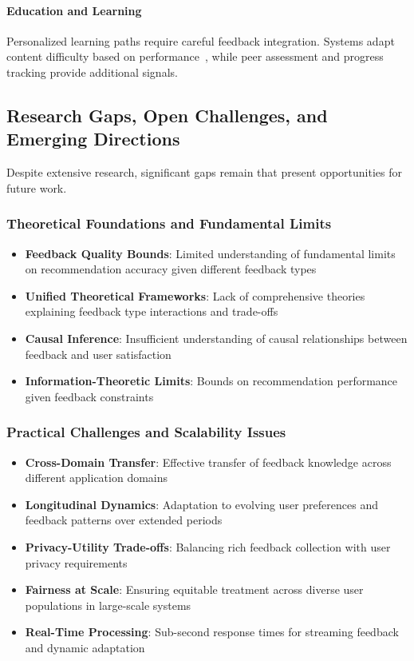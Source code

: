 \paragraph{Education and Learning}
Personalized learning paths require careful feedback integration. Systems adapt content difficulty based on performance~\cite{tang2019towards}, while peer assessment and progress tracking provide additional signals.

\subsection{Research Gaps, Open Challenges, and Emerging Directions}

Despite extensive research, significant gaps remain that present opportunities for future work.

\subsubsection{Theoretical Foundations and Fundamental Limits}

\begin{itemize}
    \item \textbf{Feedback Quality Bounds}: Limited understanding of fundamental limits on recommendation accuracy given different feedback types
    \item \textbf{Unified Theoretical Frameworks}: Lack of comprehensive theories explaining feedback type interactions and trade-offs
    \item \textbf{Causal Inference}: Insufficient understanding of causal relationships between feedback and user satisfaction
    \item \textbf{Information-Theoretic Limits}: Bounds on recommendation performance given feedback constraints
\end{itemize}

\subsubsection{Practical Challenges and Scalability Issues}

\begin{itemize}
    \item \textbf{Cross-Domain Transfer}: Effective transfer of feedback knowledge across different application domains
    \item \textbf{Longitudinal Dynamics}: Adaptation to evolving user preferences and feedback patterns over extended periods
    \item \textbf{Privacy-Utility Trade-offs}: Balancing rich feedback collection with user privacy requirements
    \item \textbf{Fairness at Scale}: Ensuring equitable treatment across diverse user populations in large-scale systems
    \item \textbf{Real-Time Processing}: Sub-second response times for streaming feedback and dynamic adaptation
\end{itemize}

